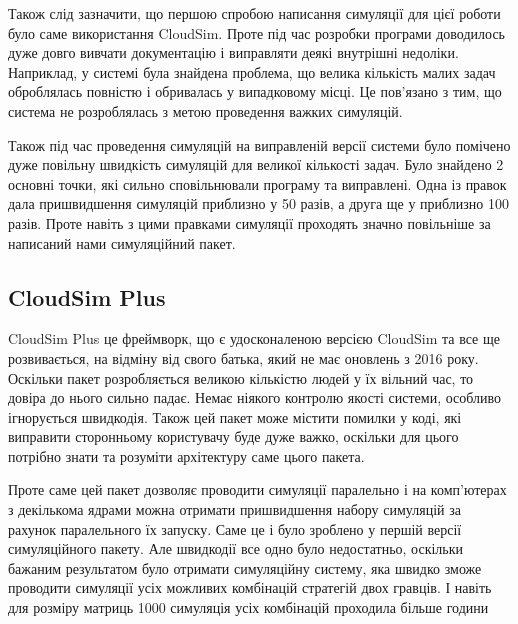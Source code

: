 Також слід зазначити, що першою спробою написання симуляції для цієї роботи було саме використання CloudSim. Проте під час розробки програми доводилось дуже довго вивчати документацію і виправляти деякі внутрішні недоліки. Наприклад, у системі була знайдена проблема, що велика кількість малих задач оброблялась повністю і обривалась у випадковому місці. Це пов'язано з тим, що система не розроблялась з метою проведення важких симуляцій.

Також під час проведення симуляцій на виправленій версії системи було помічено дуже повільну швидкість симуляцій для великої кількості задач. Було знайдено 2 основні точки, які сильно сповільнювали програму та виправлені. Одна із правок дала пришвидшення симуляцій приблизно у 50 разів, а друга ще у приблизно 100 разів. Проте навіть з цими правками симуляції проходять значно повільніше за написаний нами симуляційний пакет.

\subsection{CloudSim Plus}

CloudSim Plus \cite{CloudSimPlus} це фреймворк, що є удосконаленою версією CloudSim та все ще розвивається, на відміну від свого батька, який не має оновлень з 2016 року. Оскільки пакет розробляється великою кількістю людей у їх вільний час, то довіра до нього сильно падає. Немає ніякого контролю якості системи, особливо ігнорується швидкодія. Також цей пакет може містити помилки у коді, які виправити сторонньому користувачу буде дуже важко, оскільки для цього потрібно знати та розуміти архітектуру саме цього пакета.

Проте саме цей пакет дозволяє проводити симуляції паралельно і на комп'ютерах з декількома ядрами можна отримати пришвидшення набору симуляцій за рахунок паралельного їх запуску. Саме це і було зроблено у першій версії симуляційного пакету. Але швидкодії все одно було недостатньо, оскільки бажаним результатом було отримати симуляційну систему, яка швидко зможе проводити симуляції усіх можливих комбінацій стратегій двох гравців. І навіть для розміру матриць 1000 симуляція усіх комбінацій проходила більше години